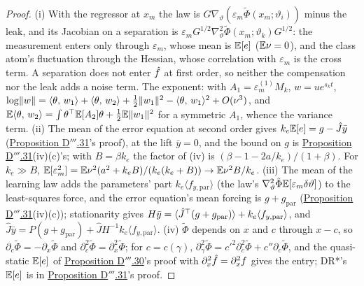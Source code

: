 \begin{proof}
(i) With the regressor at $x_m$ the law is $G\nabla_\vartheta(\varepsilon_m\tilde\Phi(x_m;\vartheta_i))$ minus the
leak, and its Jacobian on a separation is $\varepsilon_mG^{1/2}\nabla^2_\vartheta\tilde\Phi(x_m;\vartheta_k)G^{1/2}$:
the measurement enters only through $\varepsilon_m$, whose mean is $\mathbb{E}[e]$ ($\mathbb{E}\nu = 0$), and the class atom's
fluctuation through the Hessian, whose correlation with $\varepsilon_m$ is the cross term. A separation does not enter
$\hat f$ at first order, so neither the compensation nor the leak adds a noise term. The exponent: with
$A_1 = \varepsilon_m^{(1)}M_k$, $w = ue^{s_kt}$,
$\log\lVert w\rVert = \langle \theta,\, w_1\rangle + \langle \theta,\, w_2\rangle + \frac12\lVert w_1\rVert^2 - \langle \theta,\, w_1\rangle^2 + O(\nu^3)$, and
$\mathbb{E}\langle \theta,\, w_2\rangle = \int\theta^\top\mathbb{E}[A_2]\theta + \frac12\mathbb{E}\lVert w_1\rVert^2$ for a symmetric $A_1$, whence the variance
term. (ii) The mean of the error equation at second order gives $k_e\mathbb{E}[e] = g - \hat J\bar y$
(\hyperref[res:thmDppp:31]{Proposition D$'''$.31}'s proof), at the lift $\bar y = 0$, and the bound on $g$ is
\hyperref[res:thmDppp:31]{Proposition D$'''$.31}(iv)(c)'s; with $B = \beta k_e$ the factor of (iv) is
$(\beta - 1 - 2a/k_e)/(1 + \beta)$. For $k_e\gg B$,
$\mathbb{E}[\varepsilon_m^2] = \mathbb{E}\nu^2(a^2 + k_eB)/(k_e(k_e + B))\to\mathbb{E}\nu^2B/k_e$. (iii) The mean of the learning law adds
the parameters' part $k_e\langle f_{y,\mathrm{par}}\rangle$ (the law's
$\nabla^2_\vartheta\tilde\Phi\mathbb{E}[\varepsilon_m\delta\vartheta]$) to the least-squares force, and the error equation's
mean forcing is $g + g_{\mathrm{par}}$ (\hyperref[res:thmDppp:31]{Proposition D$'''$.31}(iv)(c)); stationarity gives
$H\bar y = \langle\hat J^\top(g + g_{\mathrm{par}})\rangle + k_e\langle f_{y,\mathrm{par}}\rangle$, and
$\hat J\bar y = P(g + g_{\mathrm{par}}) + \hat JH^{-1}k_e\langle f_{y,\mathrm{par}}\rangle$. (iv) $\tilde\Phi$ depends
on $x$ and $c$ through $x - c$, so $\partial_c\tilde\Phi = -\partial_x\tilde\Phi$ and
$\partial^2_c\tilde\Phi = \partial^2_x\tilde\Phi$; for $c = c(\gamma)$,
$\partial^2_\gamma\tilde\Phi = c'^2\partial^2_c\tilde\Phi + c''\partial_c\tilde\Phi$, and the quasi-static $\mathbb{E}[e]$ of
\hyperref[res:thmDppp:30]{Proposition D$'''$.30}'s proof with $\partial^2_x\hat f = \partial^2_xf$ gives the entry;
DR*'s $\mathbb{E}[e]$ is in \hyperref[res:thmDppp:31]{Proposition D$'''$.31}'s proof.
\end{proof}

